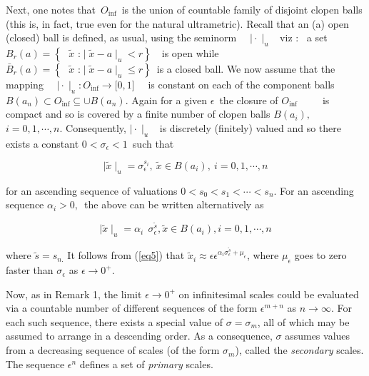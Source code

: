 \documentclass[12pt]{article}
\begin{document}
\vspace{.25cm}

Next, one notes that\ $O_{\inf }$\ is the union of countable family of
disjoint clopen balls (this is, in fact, true even for the natural ultrametric). Recall that an (a) open (closed) ball is defined, as
usual, using the seminorm \ \ $\mid \cdot \mid _{u}$ \ viz : \ a set $
B_{r}(a)=\left\{ \text{ }\tilde{x}\text{ :}\mid \tilde{x}-a\mid
_{u}<r\right\} $\ \ is open while $\bar B_{r}(a)=\left\{ \text{ }\tilde{x}\text{ :
}\mid \tilde{x}-a\mid _{u}\leq r\right\} $\ is a closed ball. We now assume
that the mapping \ \ $\mid \cdot \mid _{u}:O_{\inf }\rightarrow \lbrack 0,1]$
\ \ is constant on each of the component balls $B(a_{n})\subset O_{\inf
}\subseteq \cup B(a_{n}).$ Again for a given $\epsilon $\ the closure of $
O_{\inf }$\ \ \ \ \ is compact and so is covered by a finite number of
clopen balls $B(a_{i}),$ $i=0,1,\cdots ,n.$ Consequently, $\mid \cdot \mid_u $
\ is discretely (finitely) valued and so there exists a constant $0<\sigma_{\epsilon} <1$\ such that \bigskip

$$
\mid \tilde{x}\mid_u =\sigma_{\epsilon} ^{s_i}, \ \tilde{x}\in B(a_i), \ i=0,1,\cdots ,n
$$

\noindent for an ascending sequence of valuations $%
0<s_{0}<s_{1}<\cdots <s_{n}$. For an ascending sequence $\alpha _{i}>0,$\
the above can be written alternatively as

\begin{equation}\label{eq6}
\mid \tilde{x}\mid_u =\alpha _{i\text{ }}\sigma_{\epsilon} ^{\tilde s},\tilde{x}\in
B(a_i),i=0,1,\cdots ,n																																		
\end{equation}

\noindent where $\tilde{s}=s_{n.}$  It follows from (\ref{eq5}) that $\tilde x_i\approx \epsilon\epsilon^{\alpha_i\sigma_{\epsilon}^{\tilde s }+\mu_{\epsilon}}$, where $\mu_{\epsilon}$ goes to zero faster than $\sigma_{\epsilon}$ as $\epsilon\rightarrow 0^+$.

\vspace{.25cm}

Now, as in Remark 1, the limit $\epsilon\rightarrow 0^+$ on infinitesimal scales could be evaluated via a countable number of different sequences of the form $\epsilon^{m+n}$ as $n\rightarrow \infty$. For each such sequence, there exists a special value of $\sigma=\sigma_m$, all of which may be assumed to arrange in a descending order. As a consequence, $\sigma$ assumes values from a decreasing sequence of scales (of the form $\sigma_m$), called the {\em secondary} scales. The sequence  $\epsilon^n$ defines a set of  {\em primary} scales. 
\end{document}

